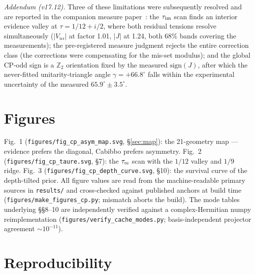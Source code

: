 \documentclass[aps,prd,preprint,nofootinbib]{revtex4-2}
\begin{document}
\emph{Addendum (v17.12).} Three of these limitations were subsequently resolved
and are reported in the companion measure paper~\cite{MeasurePaper}: the
$\tau_{\rm im}$ scan finds an interior evidence valley at $\tau=1/12+i/2$,
where both residual tensions resolve simultaneously ($|V_{us}|$ at factor 1.01,
$|J|$ at 1.24, both 68\% bands covering the measurements); the pre-registered
measure judgment rejects the entire correction class (the corrections were
compensating for the mis-set modulus); and the global CP-odd sign is a
$\mathbb{Z}_2$ orientation fixed by the measured $\mathrm{sign}(J)$, after
which the never-fitted unitarity-triangle angle $\gamma=+66.8^\circ$ falls
within the experimental uncertainty of the measured $65.9^\circ\pm 3.5^\circ$.

\section{Figures}

Fig.~1 (\texttt{figures/fig\_cp\_asym\_map.svg}, \S\ref{sec:map}): the
21-geometry map --- evidence prefers the diagonal, Cabibbo prefers asymmetry.
Fig.~2 (\texttt{figures/fig\_cp\_taure.svg}, \S7): the $\tau_{\rm re}$ scan
with the $1/12$ valley and $1/9$ ridge. Fig.~3
(\texttt{figures/fig\_cp\_depth\_curve.svg}, \S10): the survival curve of the
depth-tilted prior. All figure values are read from the machine-readable
primary sources in \texttt{results/} and cross-checked against published
anchors at build time (\texttt{figures/make\_figures\_cp.py}; mismatch aborts
the build). The mode tables underlying \S\S8--10 are independently verified
against a complex-Hermitian numpy reimplementation
(\texttt{figures/verify\_cache\_modes.py}; basis-independent projector
agreement $\sim 10^{-11}$).

\section{Reproducibility}
\end{document}

